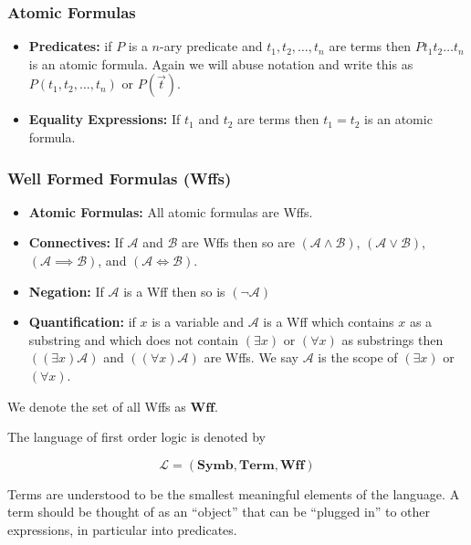 \documentclass[12pt]{article}
\newcommand{\bv}[1]{\boldsymbol{#1}}
\newcommand{\mc}[1]{\mathcal{#1}}
\newcommand{\bc}[1]{\bv{\mc{#1}}}
\begin{document}
\hrulefill
\subsubsection*{Atomic Formulas}
\begin{itemize}
\item{\textbf{Predicates:} if $P$ is a $n$-ary predicate and $t_1,t_2,\ldots,t_n$ are terms then $Pt_1t_2\ldots t_n$ is an atomic formula. Again we will abuse notation and write this as $P(t_1,t_2,\ldots,t_n)$ or $P(\vec{t})$.}
\item{\textbf{Equality Expressions:} If $t_1$ and $t_2$ are terms then $t_1=t_2$ is an atomic formula.}
\end{itemize}
\hrulefill
\subsubsection*{Well Formed Formulas (Wffs)}
\begin{itemize}
\item{\textbf{Atomic Formulas:} All atomic formulas are Wffs.}
\item{\textbf{Connectives:} If $\mc{A}$ and $\mc{B}$ are Wffs then so are $(\mc{A}\land\mc{B})$, $(\mc{A} \lor \mc{B})$, $(\mc{A}\implies\mc{B})$, and $(\mc{A}\iff\mc{B})$.}
\item{\textbf{Negation:} If $\mc{A}$ is a Wff then so is $(\lnot\mc{A})$}
\item{\textbf{Quantification:} if $x$ is a variable and $\mc{A}$ is a Wff which contains $x$ as a substring and which does not contain $(\exists x)$ or $(\forall x)$ as substrings then $((\exists x)\mc{A})$ and $((\forall x)\mathcal{A})$ are Wffs. We say $\mc{A}$ is the scope of $(\exists x)$ or $(\forall x)$.}
\end{itemize}

We denote the set of all Wffs as $\mathbf{Wff}$.

\hrulefill

The language of first order logic is denoted by

\begin{equation}
\bc{L} = (\mathbf{Symb},\mathbf{Term},\mathbf{Wff})
\end{equation}

Terms are understood to be the smallest meaningful elements of the language. A term should be thought of as an ``object'' that can be ``plugged in'' to other expressions, in particular into predicates. 
\end{document}
